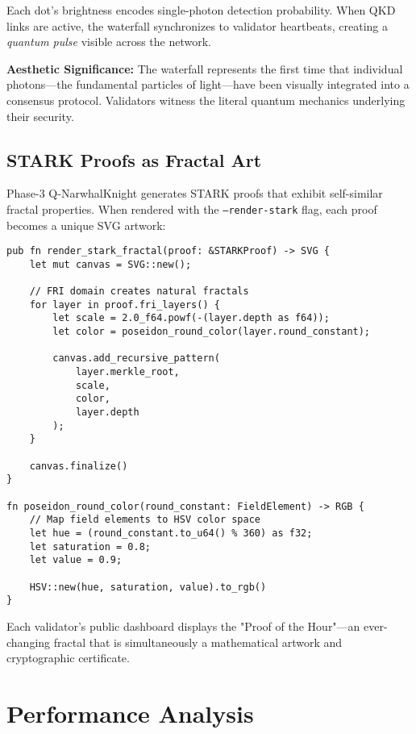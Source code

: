 \documentclass[12pt,a4paper]{article}
\begin{document}
Each dot's brightness encodes single-photon detection probability. When QKD links are active, the waterfall synchronizes to validator heartbeats, creating a \textit{quantum pulse} visible across the network.

\textbf{Aesthetic Significance:} The waterfall represents the first time that individual photons—the fundamental particles of light—have been visually integrated into a consensus protocol. Validators witness the literal quantum mechanics underlying their security.

\subsection{STARK Proofs as Fractal Art}

Phase-3 Q-NarwhalKnight generates STARK proofs that exhibit self-similar fractal properties. When rendered with the \texttt{--render-stark} flag, each proof becomes a unique SVG artwork:

\begin{lstlisting}[caption=STARK Fractal Generation]
pub fn render_stark_fractal(proof: &STARKProof) -> SVG {
    let mut canvas = SVG::new();
    
    // FRI domain creates natural fractals
    for layer in proof.fri_layers() {
        let scale = 2.0_f64.powf(-(layer.depth as f64));
        let color = poseidon_round_color(layer.round_constant);
        
        canvas.add_recursive_pattern(
            layer.merkle_root,
            scale,
            color,
            layer.depth
        );
    }
    
    canvas.finalize()
}

fn poseidon_round_color(round_constant: FieldElement) -> RGB {
    // Map field elements to HSV color space
    let hue = (round_constant.to_u64() % 360) as f32;
    let saturation = 0.8;
    let value = 0.9;
    
    HSV::new(hue, saturation, value).to_rgb()
}
\end{lstlisting}

Each validator's public dashboard displays the "Proof of the Hour"—an ever-changing fractal that is simultaneously a mathematical artwork and cryptographic certificate.

\section{Performance Analysis}
\end{document}
